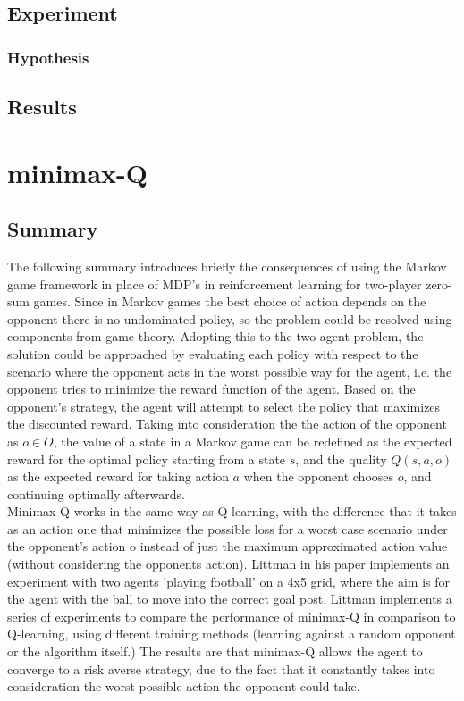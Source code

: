 \documentclass[a4paper,10pt]{article}
\begin{document}
\subsection{Experiment}



\subsubsection{Hypothesis}


\subsection{Results}









\section{minimax-Q}
\subsection{Summary}
The following summary introduces briefly the consequences of using the Markov game framework in place of MDP's in reinforcement learning for two-player zero-sum games.
Since in Markov games the best choice of action depends on the opponent there is no undominated policy, so the problem could be resolved using components from game-theory. Adopting this to the two agent problem, the solution could be approached by evaluating each policy with respect to the scenario where the opponent acts in the worst possible way for the agent, i.e. the opponent tries to minimize the reward function of the agent. Based on the opponent's strategy, the agent will attempt to select the policy that maximizes the discounted reward. Taking into consideration the the action of the opponent as $o \in O$, the value of a state in a Markov game can be redefined as the expected reward for the optimal policy starting from a state $s$, and the quality $Q(s,a,o)$ as the expected reward for taking action $a$ when the opponent chooses $o$, and continuing optimally afterwards. \\
Minimax-Q works in the same way as Q-learning, with the difference that it takes as an action one that minimizes the possible loss for a worst case scenario under the opponent's action o instead of just the maximum approximated action value (without considering the opponents action).
Littman in his paper implements an experiment with two agents 'playing football' on a 4x5 grid, where the aim is for the agent with the ball to move into the correct goal post. Littman implements a series of experiments to compare the performance of minimax-Q in comparison to Q-learning, using different training methods (learning against a random opponent or the algorithm itself.) The results are that minimax-Q allows the agent to converge to a risk averse strategy, due to the fact that it constantly takes into consideration the worst possible action the opponent could take. 
\end{document}
